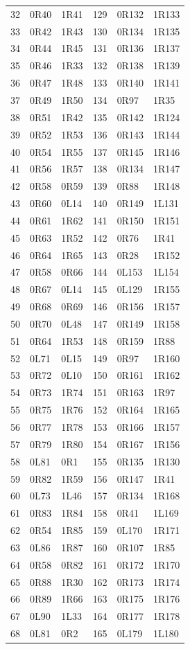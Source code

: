 \begin{longtable}{rll@{\hspace{1.2cm}}rll}
32&0R40&1R41&129&0R132&1R133\\
33&0R42&1R43&130&0R134&1R135\\
34&0R44&1R45&131&0R136&1R137\\
35&0R46&1R33&132&0R138&1R139\\
36&0R47&1R48&133&0R140&1R141\\
37&0R49&1R50&134&0R97&1R35\\
38&0R51&1R42&135&0R142&1R124\\
39&0R52&1R53&136&0R143&1R144\\
40&0R54&1R55&137&0R145&1R146\\
41&0R56&1R57&138&0R134&1R147\\
42&0R58&0R59&139&0R88&1R148\\
43&0R60&0L14&140&0R149&1L131\\
44&0R61&1R62&141&0R150&1R151\\
45&0R63&1R52&142&0R76&1R41\\
46&0R64&1R65&143&0R28&1R152\\
47&0R58&0R66&144&0L153&1L154\\
48&0R67&0L14&145&0L129&1R155\\
49&0R68&0R69&146&0R156&1R157\\
50&0R70&0L48&147&0R149&1R158\\
51&0R64&1R53&148&0R159&1R88\\
52&0L71&0L15&149&0R97&1R160\\
53&0R72&0L10&150&0R161&1R162\\
54&0R73&1R74&151&0R163&1R97\\
55&0R75&1R76&152&0R164&1R165\\
56&0R77&1R78&153&0R166&1R157\\
57&0R79&1R80&154&0R167&1R156\\
58&0L81&0R1&155&0R135&1R130\\
59&0R82&1R59&156&0R147&1R41\\
60&0L73&1L46&157&0R134&1R168\\
61&0R83&1R84&158&0R41&1L169\\
62&0R54&1R85&159&0L170&1R171\\
63&0L86&1R87&160&0R107&1R85\\
64&0R58&0R82&161&0R172&1R170\\
65&0R88&1R30&162&0R173&1R174\\
66&0R89&1R66&163&0R175&1R176\\
67&0L90&1L33&164&0R177&1R178\\
68&0L81&0R2&165&0L179&1L180\\

\end{longtable}
